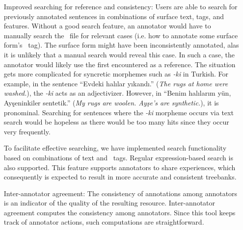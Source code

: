 \begin{itemize}[before=\normalfont, font=\itshape, align=left,noitemsep,topsep=0pt,parsep=0pt,partopsep=0pt,labelsep=3pt,align=left]
    \item[Improved searching for reference and consistency:]
        Users are able to search for previously annotated sentences in combinations of surface text, tags, and features.
		Without a good search feature, an annotator would have to manually search the \conllu\ file for relevant cases (i.e. how to annotate some surface form's \upos\ tag).
		The surface form might have been inconsistently annotated, alas it is unlikely that a manual search would reveal this case.
		In such a case, the annotator would likely use the first encountered as a reference.
        The situation gets more complicated for syncretic morphemes such as \textit{-ki} in Turkish.
        For example, in the sentence ``Evdeki halılar yıkandı.'' (\textit{The rugs at home were washed.}), the \textit{-ki} acts as an adjectivizer.
        However, in ``Benim halılarım yün, Ayşeninkiler sentetik.'' (\textit{My rugs are woolen. Ayşe's are synthetic.}), it is pronominal.
        Searching for sentences where the \textit{-ki} morpheme occurs via text search would be hopeless as there would be too many hits since they occur very frequently.

        To facilitate effective searching, we have implemented search functionality based on combinations of text and \ud\ tags.
        Regular expression-based search is also supported.
        This feature supports annotators to share experiences, which consequently is expected to result in more accurate and consistent treebanks.

    \item[Inter-annotator agreement:]
        The consistency of annotations among annotators is an indicator of the quality of the resulting resource.
        Inter-annotator agreement computes the consistency among annotators.
        Since this tool keeps track of annotator actions, such computations are straightforward.

\end{itemize}
